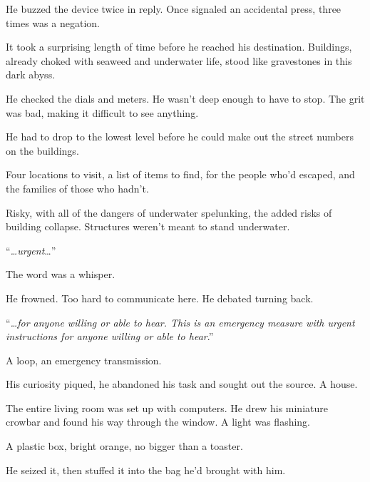 He buzzed the device twice in reply.  Once signaled an accidental press, three times was a negation.



It took a surprising length of time before he reached his destination.  Buildings, already choked with seaweed and underwater life, stood like gravestones in this dark abyss.



He checked the dials and meters.  He wasn't deep enough to have to stop.  The grit was bad, making it difficult to see anything.



He had to drop to the lowest level before he could make out the street numbers on the buildings.



Four locations to visit, a list of items to find, for the people who'd escaped, and the families of those who hadn't.



Risky, with all of the dangers of underwater spelunking, the added risks of building collapse.  Structures weren't meant to stand underwater.



``\emph{\ldots{}urgent}\ldots''



The word was a whisper.



He frowned.  Too hard to communicate here.  He debated turning back.



``\emph{\ldots{}for anyone willing or able to hear.  This is an emergency measure with urgent instructions for anyone willing or able to hear}.''



A loop, an emergency transmission.



His curiosity piqued, he abandoned his task and sought out the source.  A house.



The entire living room was set up with computers.  He drew his miniature crowbar and found his way through the window.  A light was flashing.



A plastic box, bright orange, no bigger than a toaster.



He seized it, then stuffed it into the bag he'd brought with him.



